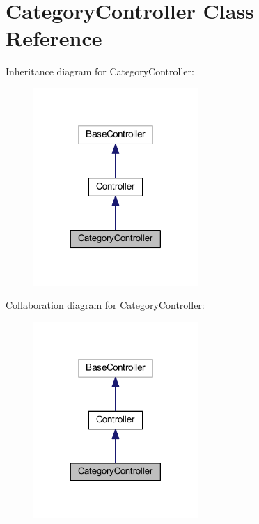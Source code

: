 \hypertarget{class_app_1_1_http_1_1_controllers_1_1_product_1_1_category_controller}{}\section{Category\+Controller Class Reference}
\label{class_app_1_1_http_1_1_controllers_1_1_product_1_1_category_controller}


Inheritance diagram for Category\+Controller\+:
\nopagebreak
\begin{figure}[H]
\begin{center}
\leavevmode
\includegraphics[width=177pt]{class_app_1_1_http_1_1_controllers_1_1_product_1_1_category_controller__inherit__graph}
\end{center}
\end{figure}


Collaboration diagram for Category\+Controller\+:
\nopagebreak
\begin{figure}[H]
\begin{center}
\leavevmode
\includegraphics[width=177pt]{class_app_1_1_http_1_1_controllers_1_1_product_1_1_category_controller__coll__graph}
\end{center}
\end{figure}
